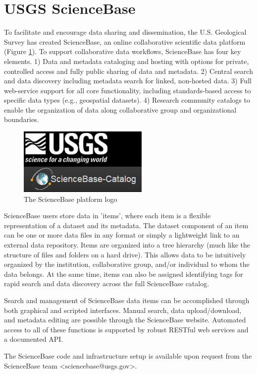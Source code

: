 \section{USGS ScienceBase}

To facilitate and encourage data sharing and dissemination,
the U.S. Geological Survey has created ScienceBase, an online
collaborative scientific data platform (Figure \ref{figure:sbfig}). To support collaborative
data workflows, ScienceBase has four key elements. 1) Data and metadata
cataloging and hosting with options for private, controlled access
and fully public sharing of data and metadata. 2) Central search and
data discovery including metadata search for linked, non-hosted data.
3) Full web-service support for all core functionality, including
standards-based access to specific data types (e.g., geospatial
datasets). 4) Research community catalogs to
enable the organization of data along collaborative group and
organizational boundaries.

 \begin{figure}[htbp]
   \centering
   \includegraphics{sblogo}
   \caption{The ScienceBase platform logo}
   \label{figure:sbfig}
 \end{figure}

ScienceBase users store data in 'items', where each item is a flexible
representation of a dataset and its metadata. The dataset component of an
item can be one or more data files in any format or simply a lightweight
link to an external data repository.
Items are organized into a tree hierarchy (much like the structure of files and
folders on a hard drive). This allows data to be intuitively organized by the
institution, collaborative group, and/or individual to whom
the data belongs. At the same time, items can also be assigned identifying tags
for rapid search and data discovery across the full ScienceBase catalog.

Search and management of ScienceBase data items can be accomplished through
both graphical and scripted interfaces. Manual search, data upload/download, and
metadata editing are possible through the ScienceBase website.
Automated access to all of these functions is supported by robust RESTful web
services and a documented API.

The ScienceBase code and infrastructure setup is available upon
request from the ScienceBase team <sciencebase@usgs.gov>.
